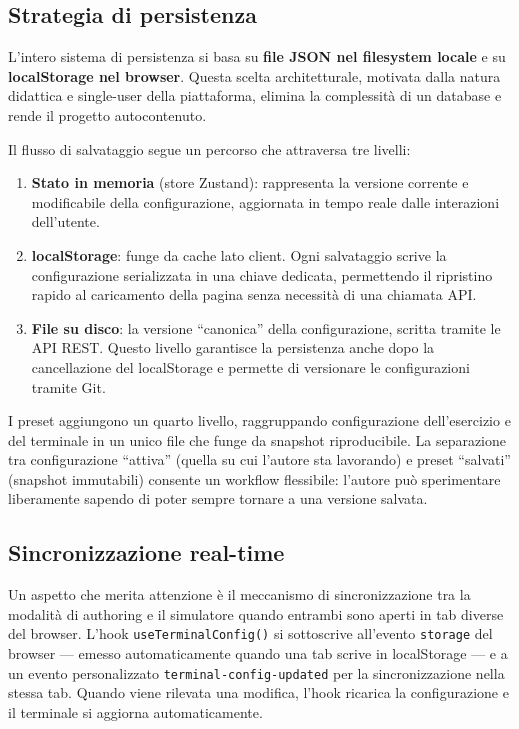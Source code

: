 \subsection{Strategia di persistenza}

L'intero sistema di persistenza si basa su \textbf{file JSON nel filesystem locale} e su \textbf{localStorage nel browser}. Questa scelta architetturale, motivata dalla natura didattica e single-user della piattaforma, elimina la complessità di un database e rende il progetto autocontenuto.

Il flusso di salvataggio segue un percorso che attraversa tre livelli:

\begin{enumerate}
    \item \textbf{Stato in memoria} (store Zustand): rappresenta la versione corrente e modificabile della configurazione, aggiornata in tempo reale dalle interazioni dell'utente.

    \item \textbf{localStorage}: funge da cache lato client. Ogni salvataggio scrive la configurazione serializzata in una chiave dedicata, permettendo il ripristino rapido al caricamento della pagina senza necessità di una chiamata API.

    \item \textbf{File su disco}: la versione ``canonica'' della configurazione, scritta tramite le API REST. Questo livello garantisce la persistenza anche dopo la cancellazione del localStorage e permette di versionare le configurazioni tramite Git.
\end{enumerate}

I preset aggiungono un quarto livello, raggruppando configurazione dell'esercizio e del terminale in un unico file che funge da snapshot riproducibile. La separazione tra configurazione ``attiva'' (quella su cui l'autore sta lavorando) e preset ``salvati'' (snapshot immutabili) consente un workflow flessibile: l'autore può sperimentare liberamente sapendo di poter sempre tornare a una versione salvata.

\subsection{Sincronizzazione real-time}

Un aspetto che merita attenzione è il meccanismo di sincronizzazione tra la modalità di authoring e il simulatore quando entrambi sono aperti in tab diverse del browser. L'hook \texttt{useTerminalConfig()} si sottoscrive all'evento \texttt{storage} del browser --- emesso automaticamente quando una tab scrive in localStorage --- e a un evento personalizzato \texttt{terminal-config-updated} per la sincronizzazione nella stessa tab. Quando viene rilevata una modifica, l'hook ricarica la configurazione e il terminale si aggiorna automaticamente.

